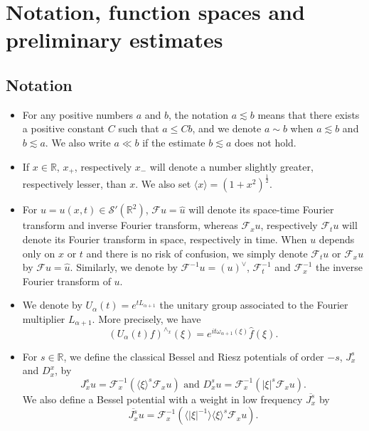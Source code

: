 \documentclass{amsart}
\theoremstyle{definition}
\theoremstyle{remark}
\def\R{{\mathbb R}}
\def\F{\mathcal{F}}
\numberwithin{equation}{section}
\newcommand\cro[1]{\langle #1 \rangle}
\begin{document}
\section{Notation, function spaces and preliminary estimates} \label{Sec:2}
\subsection{Notation} \label{notation}
\begin{itemize}

\item For any positive numbers $a$ and $b$, the notation $a\lesssim b$ means that there exists a positive constant $C$ such that $a\le Cb$, and we denote $a\sim b$ when $a\lesssim b$ and $b\lesssim a$. We also write $a\ll b$ if the estimate $b\lesssim a$ does not hold. 

\item If $x\in\R$, $x_+$, respectively $x_-$ will denote a number slightly greater, respectively lesser, than $x$. We also set $\cro{x} = (1+x^2)^{\frac12}$.

\item For $u=u(x,t)\in \mathcal{S}'(\R^2)$, $\F u=\hat{u}$ will denote its space-time Fourier transform and inverse Fourier transform, whereas $\F_xu$, respectively $\F_tu$ will denote its Fourier transform in space, respectively in time. When  $u$ depends only on $x$ or $t$ and there is no risk of confusion, we simply denote $\F_tu$ or $\F_x u$ by $\F u=\hat{u}$. Similarly, we denote by $\F^{-1} u=(u)^{\vee}$, $\F_t^{-1}$ and $\F^{-1}_x$ the inverse Fourier transform of $u$.

\item We denote by $U_{\alpha}(t)=e^{tL_{\alpha+1}}$ the unitary group associated to the Fourier multiplier $L_{\alpha+1}$. More precisely, we have 
\[ \left( U_{\alpha}(t)f \right)^{\wedge_x}(\xi)=e^{it \omega_{\alpha+1}(\xi) } \widehat{f}(\xi) . \]

\item For $s\in\R$, we define the classical Bessel and Riesz potentials of order $-s$, $J^s_x$ and $D^x_x$, by
$$
J^s_xu = \F^{-1}_x(\cro{\xi}^s\F_xu) \textrm{ and } D^s_xu = \F^{-1}_x(|\xi|^s \F_xu).
$$
We also define a Bessel potential with a weight in low frequency $\overline{J^s_x}$ by 
$$
\overline{J^s_x}u = \F^{-1}_x(\cro{|\xi|^{-1}}\cro{\xi}^s\F_xu) .
$$


\end{itemize}
\end{document}
